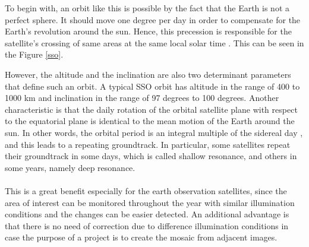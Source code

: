 \begin{itemize}
\begin{itemize}
	To begin with, an orbit like this is possible by the fact that the Earth is not a perfect sphere. It should move one degree per day in order to compensate for the Earth's revolution around the sun. Hence, this precession is responsible for the satellite's crossing of same areas at the same local solar time \cite{Meseguer, Kramer 2002}. This can be seen in the Figure \ref{sso}.
	
	However, the altitude and the inclination are also two determinant parameters that define such an orbit. A typical SSO orbit has altitude in the range of 400 to 1000 km and inclination in the range of 97 degrees to 100 degrees. Another characteristic is that the daily rotation of the orbital satellite plane with respect to the equatorial plane is identical to the mean motion of the Earth around the sun. In other words, the orbital period is an integral multiple of the sidereal day \cite{Campbell}, and this leads to a repeating groundtrack. In particular, some satellites repeat their groundtrack in some days, which is called shallow resonance, and others in some years, namely deep resonance.\\
	\\
	This is a great benefit especially for the earth observation satellites, since the area of interest can be monitored throughout the year with similar illumination conditions and the changes can be easier detected. An additional advantage is that there is no need of correction due to difference illumination conditions in case the purpose of a project is to create the mosaic from adjacent images. \\

\end{itemize}
\end{itemize}
